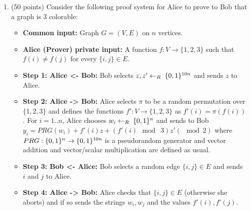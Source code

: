 \documentclass{article}
\begin{document}
\begin{enumerate}[noitemsep,topsep=\mdcompacttopsep,start=2]%

\item{}(50 points) Consider the following proof system for Alice to prove to Bob that a graph is 3 colorable:

\begin{itemize}%

\item{}
\textbf{Common input:} Graph $G=(V,E)$ on $n$ vertices.%

\item{}
\textbf{Alice (Prover) private input:} A function $f:V\rightarrow \{1,2,3\}$ such that $f(i)\neq f(j)$ for every $\{i,j\}\in E$.%

\item{}
\textbf{Step 1: Alice \textless{}- Bob:} Bob selects $z,z' \leftarrow_R\; \{0,1\}^{10n}$ and sends $z$ to Alice.%

\item{}
\textbf{Step 2: Alice -\textgreater{} Bob:} Alice selects $\pi$ to be a random permutation over $\{1,2,3\}$ and defines the functions $f':V\rightarrow \{1,2,3\}$ as $f'(i)=\pi(f(i))$. For $i=1..n$, Alice chooses  $w_i \leftarrow_R\; \{0,1\}^n$ and sends to Bob $y_i = PRG(w_i)+f'(i)z +(f'(i) \mod\; 3)z' (\mod 2)$ where $PRG:\{0,1\}^n\rightarrow\{0,1\}^{10n}$ is a pseudorandom generator and vector addition and vector/scalar multiplication are defined as usual.%

\item{}
\textbf{Step 3: Bob \textless{}- Alice:} Bob selects a random edge  $\{i,j \} \in E$ and sends $i$ and $j$ to Alice.%

\item{}
\textbf{Step 4: Alice -\textgreater{} Bob:} Alice checks that $\{i,j\}\in E$ (otherwise she aborts) and if so sends the strings $w_i,w_j$ and the values $f'(i),f'(j)$.%


\end{itemize}
\end{enumerate}
\end{document}

